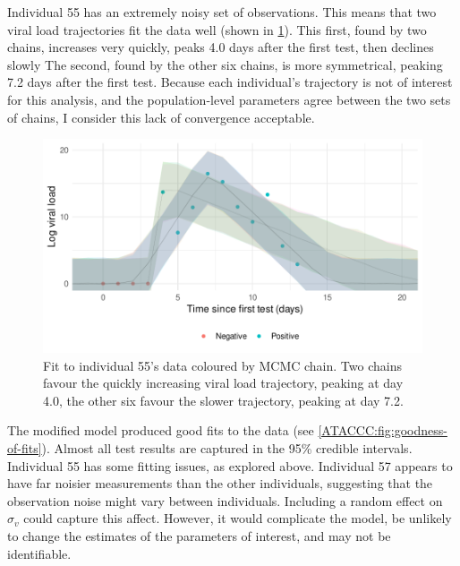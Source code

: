 \documentclass[thesis.tex]{subfiles}
\begin{document}
Individual 55 has an extremely noisy set of observations.
This means that two viral load trajectories fit the data well (shown in \cref{ATACCC:fig:individual-55}).
This first, found by two chains, increases very quickly, peaks 4.0 days after the first test, then declines slowly
The second, found by the other six chains, is more symmetrical, peaking 7.2 days after the first test.
Because each individual's trajectory is not of interest for this analysis, and the population-level parameters agree between the two sets of chains, I consider this lack of convergence acceptable.
\begin{figure}
  \centering \includegraphics{ATACCC/fit_individual_55}
  \caption[Goodness-of-fit for individual 55]{Fit to individual 55's data coloured by MCMC chain. Two chains favour the quickly increasing viral load trajectory, peaking at day 4.0, the other six favour the slower trajectory, peaking at day 7.2. \label{ATACCC:fig:individual-55}}
\end{figure}


The modified model produced good fits to the data (see \cref{ATACCC:fig:goodness-of-fits}).
Almost all test results are captured in the 95\% credible intervals.
Individual 55 has some fitting issues, as explored above.
Individual 57 appears to have far noisier measurements than the other individuals, suggesting that the observation noise might vary between individuals.
Including a random effect on $\sigma_v$ could capture this affect.
However, it would complicate the model, be unlikely to change the estimates of the parameters of interest, and may not be identifiable.
\end{document}
